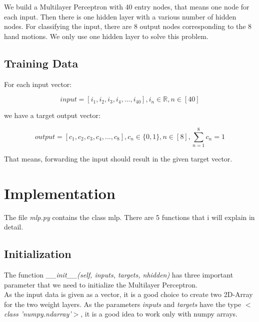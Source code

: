 \documentclass[10pt,a4paper]{article}
\begin{document}
	We build a Multilayer Perceptron with 40 entry nodes, that means one node for each input. Then there is one hidden layer with a various number of hidden nodes. For classifying the input, there are 8 output nodes corresponding to the 8 hand motions. We only use one hidden layer to solve this problem.

	\subsection{Training Data}							%
	For each input vector:
	\begin{center}

		\begin{equation}
		input = [i_1,i_2,i_3,i_4,...,i_{40}], i_n \in  \mathbb{R},n \in [40]
		\end{equation}
	\end{center}
	we have a target output vector:
	\begin{center}
		\begin{equation}
		 output = [c_1,c_2,c_3,c_4,...,c_8], c_n \in \{0,1\}, n \in [8],\sum_{n=1}^{8} c_n  = 1 
		 \end{equation}  
	\end{center}
	That means, forwarding the input should result in the given target vector. 
	\section{Implementation}
	The file \textit{mlp.py} contains the class mlp. There are 5 functions that i will explain in detail.
	\subsection{Initialization}
	The function \textit{ \_\_init\_\_(self, inputs, targets, nhidden)} has three important parameter that we need to initialize the Multilayer Perceptron. \\
	As the input data is given as a vector, it is a good choice to create two 2D-Array for the two weight layers. As the parameters \textit{inputs} and \textit{targets} have the type \textit{$<$class 'numpy.ndarray'$>$}, it is a good idea to work only with numpy arrays. \\
\end{document}
